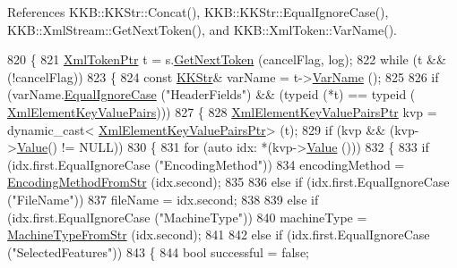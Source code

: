 References K\+K\+B\+::\+K\+K\+Str\+::\+Concat(), K\+K\+B\+::\+K\+K\+Str\+::\+Equal\+Ignore\+Case(), K\+K\+B\+::\+Xml\+Stream\+::\+Get\+Next\+Token(), and K\+K\+B\+::\+Xml\+Token\+::\+Var\+Name().


\begin{DoxyCode}
820 \{
821   \hyperlink{class_k_k_b_1_1_xml_token}{XmlTokenPtr}  t = s.\hyperlink{class_k_k_b_1_1_xml_stream_a87cc738b05c666cf5d5c25beaab477b4}{GetNextToken} (cancelFlag, log);
822   \textcolor{keywordflow}{while}  (t  &&  (!cancelFlag))
823   \{
824     \textcolor{keyword}{const} \hyperlink{class_k_k_b_1_1_k_k_str}{KKStr}&  varName = t->\hyperlink{class_k_k_b_1_1_xml_token_a28b39cfdfa2ed63048a812b1cb52263c}{VarName} ();
825 
826     \textcolor{keywordflow}{if}  (varName.\hyperlink{class_k_k_b_1_1_k_k_str_a562f9696417c53f66bc4088eac072ab5}{EqualIgnoreCase} (\textcolor{stringliteral}{"HeaderFields"})  &&  (\textcolor{keyword}{typeid} (*t) == \textcolor{keyword}{typeid} (
      \hyperlink{class_k_k_b_1_1_xml_element_key_value_pairs}{XmlElementKeyValuePairs})))
827     \{
828       \hyperlink{class_k_k_b_1_1_xml_element_key_value_pairs}{XmlElementKeyValuePairsPtr}  kvp = \textcolor{keyword}{dynamic\_cast<}
      \hyperlink{class_k_k_b_1_1_xml_element_key_value_pairs}{XmlElementKeyValuePairsPtr}\textcolor{keyword}{>} (t);
829       \textcolor{keywordflow}{if}  (kvp  &&  (kvp->\hyperlink{class_k_k_b_1_1_xml_element_key_value_pairs_ad9d419323ca34af818aac7304f0bc388}{Value}() != NULL))
830       \{
831         \textcolor{keywordflow}{for}  (\textcolor{keyword}{auto} idx: *(kvp->\hyperlink{class_k_k_b_1_1_xml_element_key_value_pairs_ad9d419323ca34af818aac7304f0bc388}{Value} ()))
832         \{
833           \textcolor{keywordflow}{if}  (idx.first.EqualIgnoreCase (\textcolor{stringliteral}{"EncodingMethod"}))
834             encodingMethod = \hyperlink{namespace_k_k_m_l_l_a100cc09ba8368cc433f3f8643e3d0abb}{EncodingMethodFromStr} (idx.second);
835 
836           \textcolor{keywordflow}{else} \textcolor{keywordflow}{if}  (idx.first.EqualIgnoreCase (\textcolor{stringliteral}{"FileName"}))
837             fileName = idx.second;
838 
839           \textcolor{keywordflow}{else} if  (idx.first.EqualIgnoreCase (\textcolor{stringliteral}{"MachineType"}))
840             machineType = \hyperlink{namespace_k_k_m_l_l_a05f26527ddefaf91b278afcd8e7981e2}{MachineTypeFromStr} (idx.second);
841 
842           \textcolor{keywordflow}{else} \textcolor{keywordflow}{if}  (idx.first.EqualIgnoreCase (\textcolor{stringliteral}{"SelectedFeatures"}))
843           \{
844             \textcolor{keywordtype}{bool}  successful = \textcolor{keyword}{false};

\end{DoxyCode}
